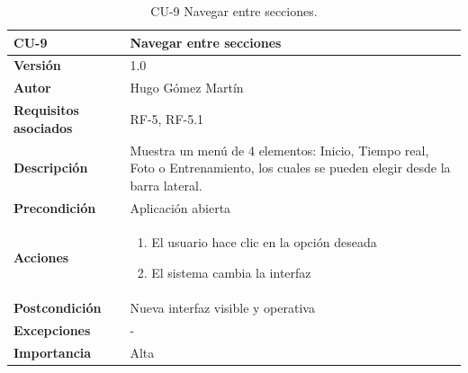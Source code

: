 \begin{table}[p]
	\centering
	\begin{tabularx}{\linewidth}{ p{} p{} }
		\toprule
		\textbf{CU-9}    & \textbf{Navegar entre secciones}\\
		\toprule
		\textbf{Versión}              & 1.0    \\
		\textbf{Autor}                & Hugo Gómez Martín \\
		\textbf{Requisitos asociados} & RF-5, RF-5.1 \\
		\textbf{Descripción}          & Muestra un menú de 4 elementos: Inicio, Tiempo real, Foto o Entrenamiento, los cuales se pueden elegir desde la barra lateral. \\
		\textbf{Precondición}         & Aplicación abierta \\
		\textbf{Acciones}             &
		\begin{enumerate}
			\def\labelenumi{\arabic{enumi}.}
			\tightlist
			\item El usuario hace clic en la opción deseada
                \item El sistema cambia la interfaz
		\end{enumerate}\\
		\textbf{Postcondición}        & Nueva interfaz visible y operativa \\
		\textbf{Excepciones}          & - \\
		\textbf{Importancia}          & Alta \\
		\bottomrule
	\end{tabularx}
	\caption{CU-9 Navegar entre secciones.}
\end{table}


